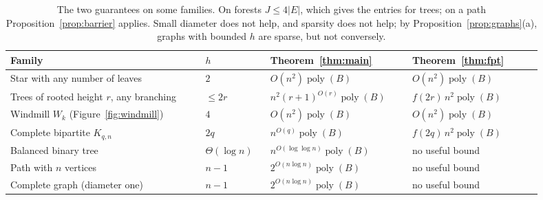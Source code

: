 \documentclass[11pt,a4paper]{article}
\theoremstyle{plain}
\theoremstyle{definition}
\theoremstyle{remark}
\newcommand{\poly}{\operatorname{poly}}
\begin{document}
\begin{table}[!ht]
\centering\small
\begin{tabular}{@{}>{\raggedright\arraybackslash}p{0.33\linewidth}p{0.11\linewidth}>{\raggedright\arraybackslash}p{0.24\linewidth}>{\raggedright\arraybackslash}p{0.22\linewidth}@{}}
\toprule
Family & $h$ & Theorem~\ref{thm:main} & Theorem~\ref{thm:fpt}\\
\midrule
Star with any number of leaves & $2$ & $O(n^2)\poly(B)$ & $O(n^2)\poly(B)$\\
Trees of rooted height $r$, any branching & $\le 2r$ & $n^2(r+1)^{O(r)}\poly(B)$ & $f(2r)\,n^2\poly(B)$\\
Windmill $W_k$ (Figure~\ref{fig:windmill}) & $4$ & $O(n^2)\poly(B)$ & $O(n^2)\poly(B)$\\
Complete bipartite $K_{q,n}$ & $2q$ & $n^{O(q)}\poly(B)$ & $f(2q)\,n^2\poly(B)$\\
Balanced binary tree & $\Theta(\log n)$ & $n^{O(\log\log n)}\poly(B)$ & no useful bound\\
Path with $n$ vertices & $n-1$ & $2^{O(n\log n)}\poly(B)$ & no useful bound\\
Complete graph (diameter one) & $n-1$ & $2^{O(n\log n)}\poly(B)$ & no useful bound\\
\bottomrule
\end{tabular}
\caption{The two guarantees on some families. On forests $J\le4|E|$, which gives the entries for trees; on a path Proposition~\ref{prop:barrier} applies. Small diameter does not help, and sparsity does not help; by Proposition~\ref{prop:graphs}(a), graphs with bounded $h$ are sparse, but not conversely.}
\label{tab:families}
\end{table}
\end{document}

